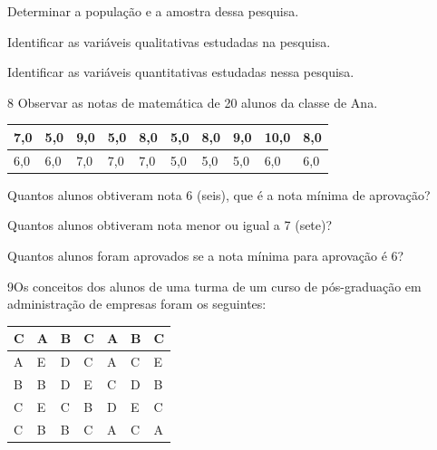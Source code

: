 \begin{escolha}
\item
  Determinar a população e a amostra dessa pesquisa.\\

\item
  Identificar as variáveis qualitativas estudadas na pesquisa.\\

\item
  Identificar as variáveis quantitativas estudadas nessa pesquisa.\\
\end{escolha}

\num{8} Observar as notas de matemática de 20 alunos da classe de Ana.

\begin{longtable}[]{@{}llllllllll@{}}
\toprule
7,0 & 5,0 & 9,0 & 5,0 & 8,0 & 5,0 & 8,0 & 9,0 & 10,0 &
8,0\tabularnewline
\midrule
\endhead
6,0 & 6,0 & 7,0 & 7,0 & 7,0 & 5,0 & 5,0 & 5,0 & 6,0 & 6,0\tabularnewline
\bottomrule
\end{longtable}

\begin{escolha}
\item
  Quantos alunos obtiveram nota 6 (seis), que é a nota mínima de aprovação?\\

\item
  Quantos alunos obtiveram nota menor ou igual a 7 (sete)?\\

\item
  Quantos alunos foram aprovados se a nota mínima para aprovação é 6?\\
\end{escolha}

\num{9}Os conceitos dos alunos de uma turma de um curso de pós-graduação
em administração de empresas foram os seguintes:

\begin{longtable}[]{@{}lllllll@{}}
\toprule
C & A & B & C & A & B & C\tabularnewline
\midrule
\endhead
A & E & D & C & A & C & E\tabularnewline
B & B & D & E & C & D & B\tabularnewline
C & E & C & B & D & E & C\tabularnewline
C & B & B & C & A & C & A\tabularnewline
\bottomrule
\end{longtable}

